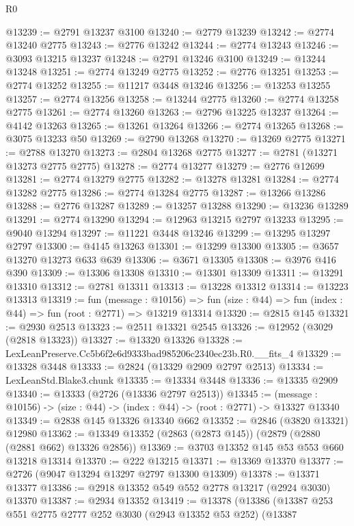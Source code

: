 \begin{lexlean}{R0}
\begin{coremodule}
@13239 := @2791 @13237 @3100
@13240 := @2779 @13239
@13242 := @2774 @13240 @2775
@13243 := @2776 @13242
@13244 := @2774 @13243
@13246 := @3093 @13215 @13237
@13248 := @2791 @13246 @3100
@13249 := @13244 @13248
@13251 := @2774 @13249 @2775
@13252 := @2776 @13251
@13253 := @2774 @13252
@13255 := @11217 @3448 @13246
@13256 := @13253 @13255
@13257 := @2774 @13256
@13258 := @13244 @2775
@13260 := @2774 @13258 @2775
@13261 := @2774 @13260
@13263 := @2796 @13225 @13237
@13264 := @4142 @13263
@13265 := @13261 @13264
@13266 := @2774 @13265
@13268 := @3075 @13233 @50
@13269 := @2790 @13268
@13270 := @13269 @2775
@13271 := @2788 @13270
@13273 := @2804 @13268 @2775
@13277 := @2781 (@13271 @13273 @2775 @2775)
@13278 := @2774 @13277
@13279 := @2776 @12699
@13281 := @2774 @13279 @2775
@13282 := @13278 @13281
@13284 := @2774 @13282 @2775
@13286 := @2774 @13284 @2775
@13287 := @13266 @13286
@13288 := @2776 @13287
@13289 := @13257 @13288
@13290 := @13236 @13289
@13291 := @2774 @13290
@13294 := @12963 @13215 @2797 @13233
@13295 := @9040 @13294
@13297 := @11221 @3448 @13246
@13299 := @13295 @13297 @2797
@13300 := @4145 @13263
@13301 := @13299 @13300
@13305 := @3657 @13270 @13273 @633 @639
@13306 := @3671 @13305
@13308 := @3976 @416 @390
@13309 := @13306 @13308
@13310 := @13301 @13309
@13311 := @13291 @13310
@13312 := @2781 @13311
@13313 := @13228 @13312
@13314 := @13223 @13313
@13319 := fun (message : @10156) =>
  fun (size : @44) => fun (index : @44) => fun (root : @2771) => @13219 @13314
@13320 := @2815 @145
@13321 := @2930 @2513
@13323 := @2511 @13321 @2545
@13326 := @12952 (@3029 (@2818 @13323))
@13327 := @13320 @13326
@13328 := LexLeanPreserve.Cc5b6f2e6d9333bad985206c2340ec23b.R0.__fits_4
@13329 := @13328 @3448
@13333 := @2824 (@13329 @2909 @2797 @2513)
@13334 := LexLeanStd.Blake3.chunk
@13335 := @13334 @3448
@13336 := @13335 @2909
@13340 := @13333 (@2726 (@13336 @2797 @2513))
@13345 := (message : @10156) -> (size : @44) -> (index : @44) -> (root : @2771) -> @13327 @13340
@13349 := @2838 @145 @13326 @13340 @662
@13352 := @2846 (@3820 @13321) @12980
@13362 := @13349 @13352 (@2863 (@2873 @145)) (@2879 (@2880 (@2881 @662) @13326 @2856))
@13369 := @3703 @13352 @145 @53 @553 @660 @13218 @13314
@13370 := @222 @13215
@13371 := @13369 @13370
@13377 := @2726 (@9047 @13294 @13297 @2797 @13300 @13309)
@13378 := @13371 @13377
@13386 := @2918 @13352 @549 @552 @2778 @13217 (@2924 @3030) @13370
@13387 := @2934 @13352
@13419 := @13378
    (@13386
      (@13387
        @253
        @551
        @2775
        @2777
        @252
        @3030
        (@2943 @13352 @53 @252)
        (@13387

\end{coremodule}
\end{lexlean}
